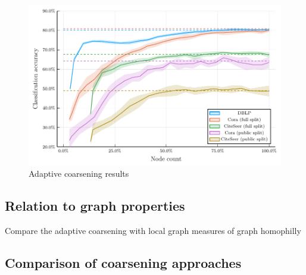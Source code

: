 \begin{figure}
  \centering
  \includegraphics[width=\linewidth]{images/adaptive-coarsening/adaptive-coarsening.pdf}
  \caption{Adaptive coarsening results}
  \label{fig:adaptive-coarsening}
\end{figure}

\subsection{Relation to graph properties}

Compare the adaptive coarsening with local graph measures of graph homophilly

\subsection{Comparison of coarsening approaches}
